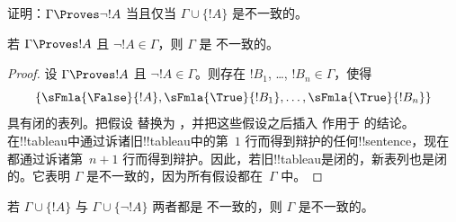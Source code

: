 \documentclass[../../../include/open-logic-section]{subfiles}
\begin{document}
\begin{prob}
证明：$\Gamma \Proves \lnot !A$ 当且仅当 $\Gamma \cup \{!A\}$ 是不一致的。
\end{prob}

\begin{prop}
  若 $\Gamma \Proves !A$ 且 $\lnot !A \in \Gamma$，则 $\Gamma$ 是
  不一致的。
\end{prop}

\begin{proof}
  设 $\Gamma \Proves !A$ 且 $\lnot !A \in \Gamma$。则存在
  $!B_1$, \dots, $!B_n \in \Gamma$，使得 \
  \[
  \{\sFmla{\False}{!A}, \sFmla{\True}{!B_1}, \dots, \sFmla{\True}{!B_n}\}
  \]
  具有闭的表列。把假设  替换为
  ，并把这些假设之后插入
  \TRule{\True}{\lnot} 作用于  的结论。在!!{tableau}中通过诉诸旧!!{tableau}中的第~$1$ 行而得到辩护的任何!!{sentence}，现在都通过诉诸第~$n+1$ 行而得到辩护。因此，若旧!!{tableau}是闭的，新表列也是闭的。它表明 $\Gamma$ 是不一致的，因为所有假设都在~$\Gamma$ 中。
\end{proof}

\begin{prop}
  若 $\Gamma \cup \{!A\}$ 与 $\Gamma \cup \{\lnot !A\}$ 两者都是
  不一致的，则 $\Gamma$ 是不一致的。
\end{prop}
\end{document}
